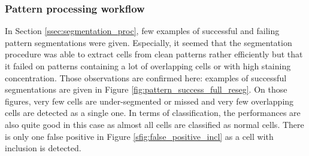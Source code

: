 \subsubsection{Pattern processing workflow}
\label{ssec:detect_pattern_processing}
In Section \ref{ssec:segmentation_proc}, few examples of successful and failing pattern segmentations were given. Especially, it seemed that the segmentation procedure was able to extract cells from clean patterns rather efficiently but that it failed on patterns containing a lot of overlapping cells or with high staining concentration. Those observations are confirmed here: examples of successful segmentations are given in Figure \ref{fig:pattern_success_full_reseg}. On those figures, very few cells are under-segmented or missed and very few overlapping cells are detected as a single one. In terms of classification, the performances are also quite good in this case as almost all cells are classified as normal cells. There is only one false positive in Figure \ref{sfig:false_positive_incl} as a cell with inclusion is detected. 


